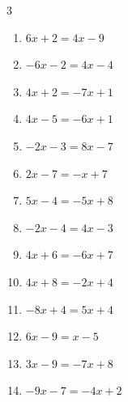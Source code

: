 \begin{multicols}{3}
\begin{enumerate}
  \item $6x+2=4x-9$


  \item $-6x-2=4x-4$


  \item $4x+2=-7x+1$


  \item $4x-5=-6x+1$


  \item $-2x-3=8x-7$


  \item $2x-7=-x+7$


  \item $5x-4=-5x+8$


  \item $-2x-4=4x-3$


  \item $4x+6=-6x+7$


  \item $4x+8=-2x+4$


  \item $-8x+4=5x+4$

        \phantom{$\displaystyle x=0$}

  \item $6x-9=x-5$


  \item $3x-9=-7x+8$


\columnbreak %

  \item $-9x-7=-4x+2$


\end{enumerate}
\end{multicols}
